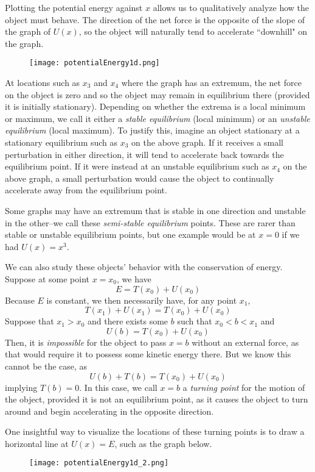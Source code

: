 Plotting the potential energy against $x$ allows us to qualitatively analyze how the object must behave. The direction of the net force is the opposite of the slope of the graph of $U(x)$, so the object will naturally tend to accelerate ``downhill" on the graph.
\begin{figure}[h!]
    \centering
    \texttt{[image: potentialEnergy1d.png]}
    \label{fig:U1d}
\end{figure}
At locations such as $x_3$ and $x_4$ where the graph has an extremum, the net force on the object is zero and so the object may remain in equilibrium there (provided it is initially stationary). Depending on whether the extrema is a local minimum or maximum, we call it either a \textit{stable equilibrium} (local minimum) or an \textit{unstable equilibrium} (local maximum). To justify this, imagine an object stationary at a stationary equilibrium such as $x_3$ on the above graph. If it receives a small perturbation in either direction, it will tend to accelerate back towards the equilibrium point. If it were instead at an unstable equilibrium such as $x_4$ on the above graph, a small perturbation would cause the object to continually accelerate away from the equilibrium point.

Some graphs may have an extremum that is stable in one direction and unstable in the other--we call these \textit{semi-stable equilibrium} points. These are rarer than stable or unstable equilibrium points, but one example would be at $x=0$ if we had $U(x) = x^3$.

We can also study these objects' behavior with the conservation of energy. Suppose at some point $x=x_0$, we have
\[ E = T(x_0) + U(x_0) \]
Because $E$ is constant, we then necessarily have, for any point $x_1$,
\[ T(x_1) + U(x_1) = T(x_0) + U(x_0) \]
Suppose that $x_1 > x_0$ and there exists some $b$ such that $x_0 < b < x_1$ and
\[ U(b) = T(x_0) + U(x_0) \]
Then, it is \textit{impossible} for the object to pass $x = b$ without an external force, as that would require it to possess some kinetic energy there. But we know this cannot be the case, as 
\[ U(b) + T(b) = T(x_0) + U(x_0)  \]
implying $T(b) = 0$. In this case, we call $x=b$ a \textit{turning point} for the motion of the object, provided it is not an equilibrium point, as it causes the object to turn around and begin accelerating in the opposite direction.

One insightful way to visualize the locations of these turning points is to draw a horizontal line at $U(x) = E$, such as the graph below.
\begin{figure}[h!]
    \centering
    \texttt{[image: potentialEnergy1d\_2.png]}
    \label{fig:U1d2}
\end{figure}

